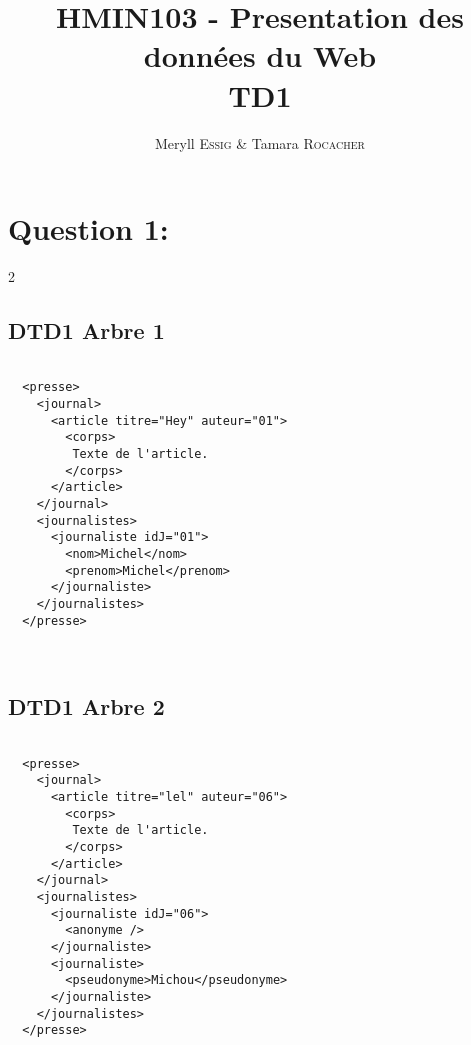 \documentclass[10pt]{article}
\title{HMIN103 - Presentation des données du Web\\TD1}
\author{Meryll \textsc{Essig} & Tamara \textsc{Rocacher}}
\newenvironment{DDbox}[1]{
\begin{lrbox}{\BBbox}\begin{minipage}{\linewidth}}
{\end{minipage}\end{lrbox}\noindent\colorbox{white}{\usebox{\BBbox}} \\
[.5cm]}
\begin{document}
\maketitle

\section{Question 1:}
\begin{multicols}{2}
  \subsection{DTD1 Arbre 1}


  \begin{DDbox}{0.4}
  \begin{lstlisting}

  <presse>
    <journal>
      <article titre="Hey" auteur="01">
        <corps>
  	     Texte de l'article.
        </corps>
      </article>
    </journal>
    <journalistes>
      <journaliste idJ="01">
        <nom>Michel</nom>
        <prenom>Michel</prenom>
      </journaliste>
    </journalistes>
  </presse>

  \end{lstlisting}
  \end{DDbox}

  \subsection{DTD1 Arbre 2}



  \begin{DDbox}{0.4}
  \begin{lstlisting}

  <presse>
    <journal>
      <article titre="lel" auteur="06">
        <corps>
  	     Texte de l'article.
        </corps>
      </article>
    </journal>
    <journalistes>
      <journaliste idJ="06">
        <anonyme />
      </journaliste>
      <journaliste>
        <pseudonyme>Michou</pseudonyme>
      </journaliste>
    </journalistes>
  </presse>

  \end{lstlisting}
  \end{DDbox}
\end{multicols}
\newpage
\end{document}
